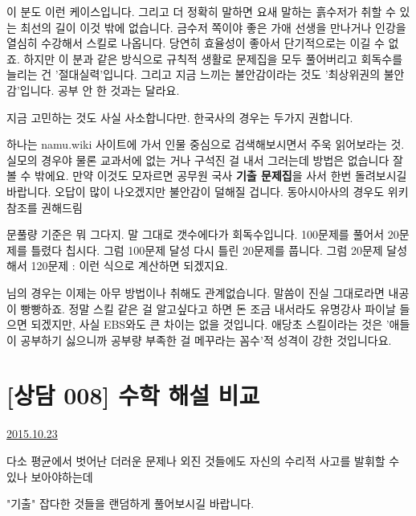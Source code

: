 이 분도 이런 케이스입니다. 그리고 더 정확히 말하면 요새 말하는 흙수저가 취할 수 있는 최선의 길이 이것 밖에 없습니다.
금수저 쪽이야 좋은 가애 선생을 만나거나 인강을 열심히 수강해서 스킬로 나옵니다. 당연히 효율성이 좋아서 단기적으로는 이길 수 없죠.
하지만 이 분과 같은 방식으로 규칙적 생활로 문제집을 모두 풀어버리고 회독수를 늘리는 건 '절대실력'입니다.
그리고 지금 느끼는 불안감이라는 것도 '최상위권의 불안감'입니다. 공부 안 한 것과는 달라요.
\vspace{5mm}

지금 고민하는 것도 사실 사소합니다만.
한국사의 경우는 두가지 권합니다.
\vspace{5mm}

하나는 namu.wiki 사이트에 가서 인물 중심으로 검색해보시면서 주욱 읽어보라는 것.
실모의 경우야 물론 교과서에 없는 거나 구석진 걸 내서 그러는데 방법은 없습니다 잘 볼 수 밖에요.
만약 이것도 모자르면 공무원 국사 \textbf{기출 문제집}을 사서 한번 돌려보시길 바랍니다. 오답이 많이 나오겠지만 불안감이 덜해질 겁니다.
동아시아사의 경우도 위키 참조를 권해드림
\vspace{5mm}

문풀량 기준은 뭐 그다지. 말 그대로 갯수에다가 회독수입니다.
100문제를 풀어서 20문제를 틀렸다 칩시다. 그럼 100문제 달성
다시 틀린 20문제를 풉니다. 그럼 20문제 달성해서 120문제 : 이런 식으로 계산하면 되겠지요.
\vspace{5mm}

님의 경우는 이제는 아무 방법이나 취해도 관계없습니다. 말씀이 진실 그대로라면 내공이 빵빵하죠.
정말 스킬 같은 걸 알고싶다고 하면 돈 조금 내서라도 유명강사 파이날 들으면 되겠지만, 사실 EBS와도 큰 차이는 없을 것입니다.
애당초 스킬이라는 것은 '애들이 공부하기 싫으니까 공부량 부족한 걸 메꾸라는 꼼수'적 성격이 강한 것입니다요.
\vspace{5mm}






\section{[상담 008] 수학 해설 비교}
\href{https://www.kockoc.com/Apoc/437233}{2015.10.23}



    \vspace{5mm}

    다소 평균에서 벗어난 더러운 문제나 외진 것들에도 자신의 수리적 사고를 발휘할 수 있나 보아야하는데
    \vspace{5mm}

    "기출" 잡다한 것들을 랜덤하게 풀어보시길 바랍니다.
    \vspace{5mm}

